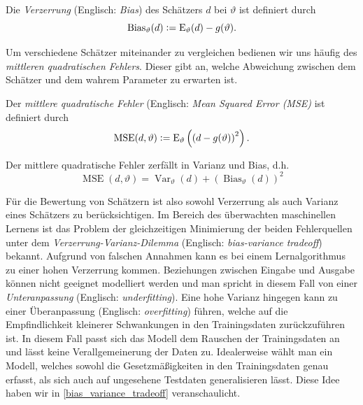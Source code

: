 \begin{defn}
Die \textit{Verzerrung} (Englisch: \textit{Bias}) des Schätzers $d$ bei $\vartheta$ ist definiert durch
$$\operatorname {Bias} _{\vartheta }(d) \vcentcolon= \operatorname {E} _{\vartheta }(d)-g(\vartheta ).$$
\end{defn}


Um verschiedene Schätzer miteinander zu vergleichen bedienen wir uns häufig des \textit{mittleren quadratischen Fehlers}. Dieser gibt an, welche Abweichung zwischen dem Schätzer und dem wahrem Parameter zu erwarten ist.

\begin{defn}
Der \textit{mittlere quadratische Fehler} (Englisch: \textit{Mean Squared Error (MSE)} ist definiert durch
$$\operatorname {MSE} (d,\vartheta ) \vcentcolon= \operatorname{E} _{\vartheta}\left(\left(d-g(\vartheta )\right)^{2}\right).$$
\end{defn}

\begin{thm}
Der mittlere quadratische Fehler zerfällt in Varianz und Bias, d.h.
$$\operatorname{MSE} (d,\vartheta ) = \operatorname{Var}_{\vartheta }(d)+\left(\operatorname{Bias}_{\vartheta}(d)\right)^{2}$$
\end{thm}

Für die Bewertung von Schätzern ist also sowohl Verzerrung als auch Varianz eines Schätzers zu berücksichtigen. Im Bereich des überwachten maschinellen Lernens ist das Problem der gleichzeitigen Minimierung der beiden Fehlerquellen unter dem \textit{Verzerrung-Varianz-Dilemma} (Englisch: \textit{bias-variance tradeoff}) bekannt. Aufgrund von falschen Annahmen kann es bei einem Lernalgorithmus zu einer hohen Verzerrung kommen. Beziehungen zwischen Eingabe und Ausgabe können nicht geeignet modelliert werden und man spricht in diesem Fall von einer \textit{Unteranpassung} (Englisch: \textit{underfitting}). Eine hohe Varianz hingegen kann zu einer Überanpassung (Englisch: \textit{overfitting}) führen, welche auf die Empfindlichkeit kleinerer Schwankungen in den Trainingsdaten zurückzuführen ist. In diesem Fall passt sich das Modell dem Rauschen der Trainingsdaten an und lässt keine Verallgemeinerung der Daten zu. Idealerweise wählt man ein Modell, welches sowohl die Gesetzmäßigkeiten in den Trainingsdaten genau erfasst, als sich auch auf ungesehene Testdaten generalisieren lässt. Diese Idee haben wir in \ref{bias_variance_tradeoff} veranschaulicht.

